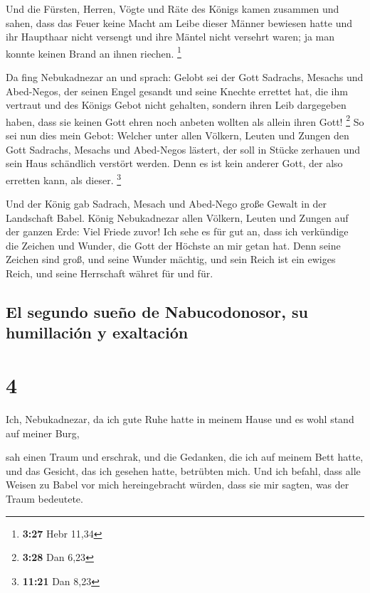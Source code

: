  Und die Fürsten, Herren, Vögte und Räte des Königs kamen
zusammen und sahen, dass das Feuer keine Macht am Leibe dieser Männer
bewiesen hatte und ihr Haupthaar nicht versengt und ihre Mäntel nicht
versehrt waren; ja man konnte keinen Brand an ihnen riechen. \footnote{\textbf{3:27}
  Hebr 11,34}

 Da fing Nebukadnezar an und sprach: Gelobt sei der Gott
Sadrachs, Mesachs und Abed-Negos, der seinen Engel gesandt und seine
Knechte errettet hat, die ihm vertraut und des Königs Gebot nicht
gehalten, sondern ihren Leib dargegeben haben, dass sie keinen Gott
ehren noch anbeten wollten als allein ihren Gott! \footnote{\textbf{3:28}
  Dan 6,23}  So sei nun dies mein Gebot: Welcher unter
allen Völkern, Leuten und Zungen den Gott Sadrachs, Mesachs und
Abed-Negos lästert, der soll in Stücke zerhauen und sein Haus schändlich
verstört werden. Denn es ist kein anderer Gott, der also erretten kann,
als dieser. \footnote{\textbf{11:21} Dan 8,23}

 Und der König gab Sadrach, Mesach und Abed-Nego große
Gewalt in der Landschaft Babel.  König Nebukadnezar allen
Völkern, Leuten und Zungen auf der ganzen Erde: Viel Friede zuvor!
 Ich sehe es für gut an, dass ich verkündige die Zeichen
und Wunder, die Gott der Höchste an mir getan hat.  Denn
seine Zeichen sind groß, und seine Wunder mächtig, und sein Reich ist
ein ewiges Reich, und seine Herrschaft währet für und für.

\hypertarget{el-segundo-sueuxf1o-de-nabucodonosor-su-humillaciuxf3n-y-exaltaciuxf3n}{%
\subsection{El segundo sueño de Nabucodonosor, su humillación y
exaltación}\label{el-segundo-sueuxf1o-de-nabucodonosor-su-humillaciuxf3n-y-exaltaciuxf3n}}

\hypertarget{section-3}{%
\section{4}\label{section-3}}

 Ich, Nebukadnezar, da ich gute Ruhe hatte in meinem Hause
und es wohl stand auf meiner Burg,

 sah einen Traum und erschrak, und die Gedanken, die ich
auf meinem Bett hatte, und das Gesicht, das ich gesehen hatte, betrübten
mich.  Und ich befahl, dass alle Weisen zu Babel vor mich
hereingebracht würden, dass sie mir sagten, was der Traum bedeutete.

